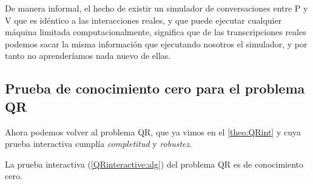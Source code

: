 

De manera informal, el hecho de existir un simulador de conversaciones entre P y V que es idéntico a las interacciones reales, y que puede ejecutar cualquier máquina limitada computacionalmente, significa que de las transcripciones reales podemos sacar la misma información que ejecutando nosotros el simulador, y por tanto no aprenderíamos nada nuevo de ellas.



\subsection{Prueba de conocimiento cero para el problema QR}

Ahora podemos volver al problema QR, que ya vimos en el \autoref{theo:QRint} y cuya prueba interactiva cumplía \textit{completitud} y \textit{robustez}.

\begin{theorem}
	La prueba interactiva (\ref{QRinteractive:alg}) del problema QR es de conocimiento cero.
\end{theorem}

